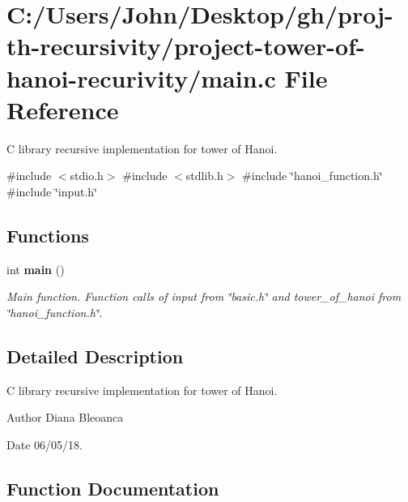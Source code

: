 \section{C\+:/\+Users/\+John/\+Desktop/gh/proj-\/th-\/recursivity/project-\/tower-\/of-\/hanoi-\/recurivity/main.c File Reference}
\label{main_8c}


C library recursive implementation for tower of Hanoi.  


{\ttfamily \#include $<$stdio.\+h$>$}\newline
{\ttfamily \#include $<$stdlib.\+h$>$}\newline
{\ttfamily \#include \char`\"{}hanoi\+\_\+function.\+h\char`\"{}}\newline
{\ttfamily \#include \char`\"{}input.\+h\char`\"{}}\newline
\subsection*{Functions}
\begin{DoxyCompactItemize}
\item 
int \textbf{ main} ()
\begin{DoxyCompactList}\small\item\em Main function. Function calls of input from \char`\"{}basic.\+h\char`\"{} and tower\+\_\+of\+\_\+hanoi from \char`\"{}hanoi\+\_\+function.\+h\char`\"{}. \end{DoxyCompactList}\end{DoxyCompactItemize}


\subsection{Detailed Description}
C library recursive implementation for tower of Hanoi. 

\begin{DoxyAuthor}{Author}
Diana Bleoanca 
\end{DoxyAuthor}
\begin{DoxyDate}{Date}
06/05/18. 
\end{DoxyDate}


\subsection{Function Documentation}
\mbox{\label{main_8c_ae66f6b31b5ad750f1fe042a706a4e3d4}} 
